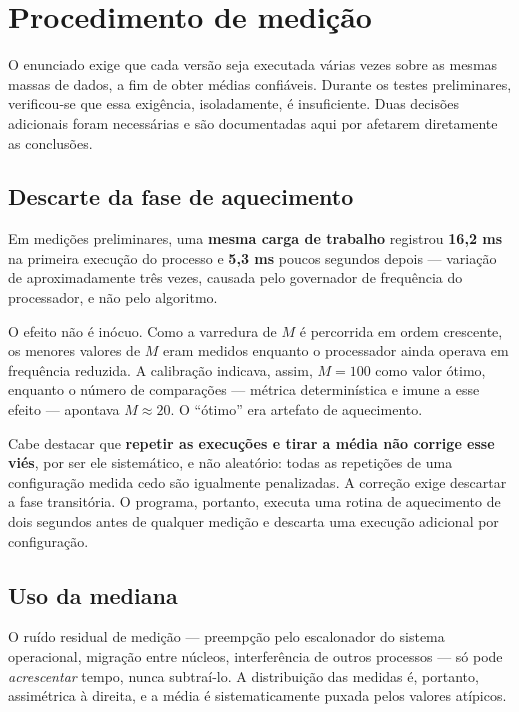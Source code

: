 \section{Procedimento de medição}
\label{sec:medicao}

O enunciado exige que cada versão seja executada várias vezes sobre as mesmas massas
de dados, a fim de obter médias confiáveis. Durante os testes preliminares,
verificou-se que essa exigência, isoladamente, é insuficiente. Duas decisões
adicionais foram necessárias e são documentadas aqui por afetarem diretamente as
conclusões.

\subsection{Descarte da fase de aquecimento}

Em medições preliminares, uma \textbf{mesma carga de trabalho} registrou
\textbf{16,2 ms} na primeira execução do processo e \textbf{5,3 ms} poucos segundos
depois --- variação de aproximadamente três vezes, causada pelo governador de
frequência do processador, e não pelo algoritmo.

O efeito não é inócuo. Como a varredura de $M$ é percorrida em ordem crescente, os
menores valores de $M$ eram medidos enquanto o processador ainda operava em
frequência reduzida. A calibração indicava, assim, $M = 100$ como valor ótimo,
enquanto o número de comparações --- métrica determinística e imune a esse efeito ---
apontava $M \approx 20$. O ``ótimo'' era artefato de aquecimento.

Cabe destacar que \textbf{repetir as execuções e tirar a média não corrige esse
viés}, por ser ele sistemático, e não aleatório: todas as repetições de uma
configuração medida cedo são igualmente penalizadas. A correção exige descartar a
fase transitória. O programa, portanto, executa uma rotina de aquecimento de dois
segundos antes de qualquer medição e descarta uma execução adicional por
configuração.

\subsection{Uso da mediana}

O ruído residual de medição --- preempção pelo escalonador do sistema operacional,
migração entre núcleos, interferência de outros processos --- só pode
\textit{acrescentar} tempo, nunca subtraí-lo. A distribuição das medidas é, portanto,
assimétrica à direita, e a média é sistematicamente puxada pelos valores atípicos.


